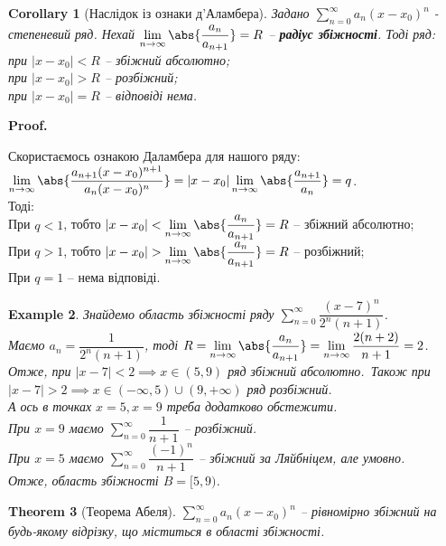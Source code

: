 \documentclass[a4paper, 10pt]{article}
\makeatletter
\def\huge{\displaystyle}
\def\qed{$\blacksquare$}
\theoremstyle{theoremdd}
\newtheorem{theorem}{Theorem}[subsection]
\theoremstyle{theoremdd}
\theoremstyle{theoremdd}
\theoremstyle{theoremdd}
\theoremstyle{theoremdd}
\newtheorem{example}[theorem]{Example}
\theoremstyle{theoremdd}
\theoremstyle{theoremdd}
\theoremstyle{theoremdd}
\theoremstyle{theoremdd}
\newtheorem{corollary}[theorem]{Corollary}
\renewenvironment{proof}[1][Proof.\\]{\par
\pushQED{\hfill \qed}%
\normalfont \topsep6\p@\@plus6\p@\relax
\trivlist
\item\relax
{\bfseries
#1\@addpunct{.}}\hspace\labelsep\ignorespaces
}{%
\popQED\endtrivlist\@endpefalse
}
\makeatother
\begin{document}
\begin{corollary}[Наслідок із ознаки д'Аламбера]
Задано $\huge \sum_{n=0}^\infty a_n(x-x_0)^n$ - степеневий ряд. Нехай $\huge \lim_{n \to \infty} \abs{\dfrac{a_n}{a_{n+1}}} = R$ -- \textbf{радіус збіжності}. Тоді ряд:\\
при $|x-x_0|<R$ -- збіжний абсолютно;\\
при $|x-x_0|>R$ -- розбіжний;\\
при $|x-x_0|=R$ -- відповіді нема.
\end{corollary}

\begin{proof}
Скористаємось ознакою Даламбера для нашого ряду:\\
$\huge \lim_{n \to \infty} \abs{\dfrac{a_{n+1}(x-x_0)^{n+1}}{a_n(x-x_0)^n}} = |x-x_0| \lim_{n \to \infty} \abs{\dfrac{a_{n+1}}{a_n}} = q$.\\
Тоді:\\
При $q < 1$, тобто $|x-x_0| < \huge \lim_{n \to \infty} \abs{\dfrac{a_n}{a_{n+1}}} = R$ -- збіжний абсолютно;\\
При $q > 1$, тобто $|x-x_0| > \huge \lim_{n \to \infty} \abs{\dfrac{a_n}{a_{n+1}}} = R$ -- розбіжний;\\
При $q = 1$ -- нема відповіді.
\end{proof}

\begin{example}
Знайдемо область збіжності ряду $\huge\sum_{n=0}^\infty \dfrac{(x-7)^n}{2^n (n+1)}$.\\
Маємо $a_n = \dfrac{1}{2^n (n+1)}$, тоді $R = \huge\lim_{n \to \infty} \abs{\dfrac{a_n}{a_{n+1}}} = \lim_{n \to \infty} \dfrac{2(n+2)}{n+1} = 2$.\\
Отже, при $|x-7| < 2 \implies x \in (5,9)$ ряд збіжний абсолютно.\
Також при $|x-7| > 2 \implies x \in (-\infty,5) \cup (9,+\infty)$ ряд розбіжний.\\
А ось в точках $x = 5, x = 9$ треба додатково обстежити.\\
При $x=9$ маємо $\huge\sum_{n=0}^\infty \dfrac{1}{n+1}$ -- розбіжний.\\
При $x=5$ маємо $\huge\sum_{n=0}^\infty \dfrac{(-1)^n}{n+1}$ -- збіжний за Ляйбніцем, але умовно.\\
Отже, область збіжності $B = [5,9)$.
\end{example}

\begin{theorem}[Теорема Абеля]
$\huge \sum_{n=0}^\infty a_n(x-x_0)^n$ -- рівномірно збіжний на будь-якому відрізку, що міститься в області збіжності.
\end{theorem}
\end{document}
